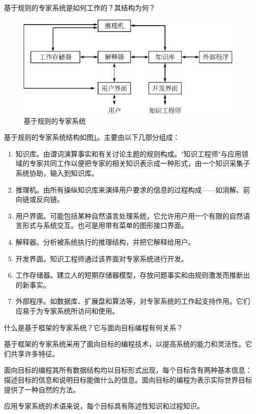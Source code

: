\begin{question}
基于规则的专家系统是如何工作的？其结构为何？
\end{question}
\begin{solution}
	\begin{figure}[h]
		\centering
		\includegraphics{figures/ans-6.6.pdf}
		\caption{基于规则的专家系统} \label{Fig:RES-structure}
	\end{figure}
基于规则的专家系统结构如图\ref{Fig:RES-structure}。主要由以下几部分组成：\par
	\begin{enumerate}
	\item 知识库。由谓词演算事实和有关讨论主题的规则构成。"知识工程师"与应用领域的专家共同工作以便把专家的相关知识表示成一种形式，由一个知识采集子系统协助，输入到知识库。\par
	\item 推理机。由所有操纵知识库来演绎用户要求的信息的过程构成——如消解、前向链或反向链。\par
	\item 用户界面。可能包括某种自然语言处理系统，它允许用户用一个有限的自然语言形式与系统交互。也可是用带有菜单的图形接口界面。\par
	\item 解释器。分析被系统执行的推理结构，并把它解释给用户。
	\item 开发界面。知识工程师通过该界面对专家系统进行开发。
	\item 工作存储器。建立人的短期存储器模型，存放问题事实和由规则激发而推断出的新事实。
	\item 外部程序。如数据库、扩展盘和算法等，对专家系统的工作起支持作用。它们应易于为专家系统所访问和使用。
	\end{enumerate}
\end{solution}

\begin{question}
什么是基于框架的专家系统？它与面向目标编程有何关系？
\end{question}
\begin{solution}
基于框架的专家系统采用了面向目标的编程技术，以提高系统的能力和灵活性。它们共享许多特征。\par
面向目标的编程其所有数据结构均以目标形式出现，每个目标含有两种基本信息：描述目标的信息和说明目标能做什么的信息。面向目标的编程为表示实际世界目标提供了一种自然的方法。\par
应用专家系统的术语来说，每个目标具有陈述性知识和过程知识。 
\end{solution}

